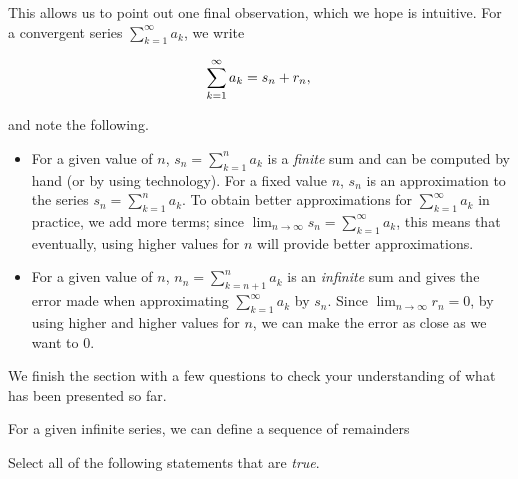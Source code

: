 \documentclass{ximera}
\begin{document}
This allows us to point out one final observation, which we hope is intuitive. For a convergent series $\sum_{k=1}^{\infty} a_k$, we write

\[
\sum_{k=1}^{\infty} a_k = s_n + r_n, \\
\]

and note the following.

\begin{itemize}
\item For a given value of $n$, $s_n = \sum_{k=1}^n a_k$ is a \emph{finite} sum and can be computed by hand (or by using technology).  For a fixed value $n$, $s_n$ is an approximation to the series $s_n = \sum_{k=1}^n a_k$.  To obtain better approximations for $\sum_{k=1}^\infty a_k$ in practice, we add more terms; since $\lim_{n \to \infty} s_n = \sum_{k=1}^\infty a_k$, this means that eventually, using higher values for $n$ will provide better approximations.
\item For a given value of $n$, $n_n = \sum_{k=n+1}^n a_k$ is an \emph{infinite} sum and gives the error made when approximating $\sum_{k=1}^{\infty} a_k$ by $s_n$.  Since $\lim_{n \to \infty} r_n = 0$, by using higher and higher values for $n$, we can make the error as close as we want to $0$.

\end{itemize}

We finish the section with a few questions to check your understanding of what has been presented so far.

\begin{question}
For a given infinite series, we can define a sequence of remainders 
\begin{multipleChoice}
\end{multipleChoice}
\end{question}

\begin{question}
Select all of the following statements that are \emph{true}.
\begin{selectAll}
\end{selectAll}
\end{question}
\end{document}
